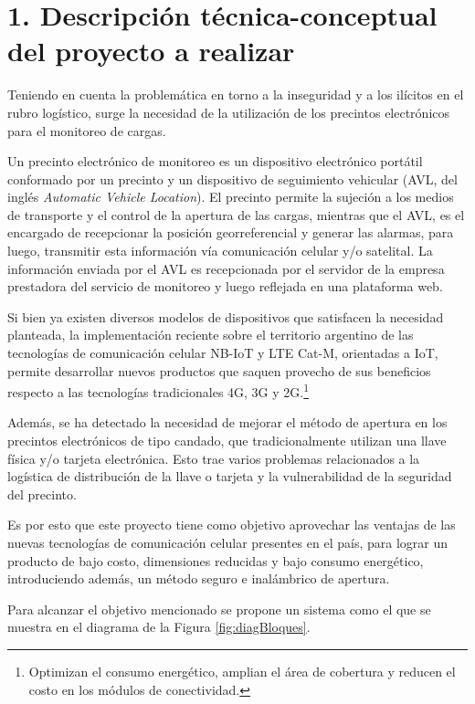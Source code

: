 \documentclass[
11pt, %
]{charter}
\begin{document}
\section{1. Descripción técnica-conceptual del proyecto a realizar}
\label{sec:descripcion}

Teniendo en cuenta la problemática en torno a la inseguridad y a los ilícitos en el rubro logístico, surge la necesidad de la utilización de los precintos electrónicos para el monitoreo de cargas.

Un precinto electrónico de monitoreo es un dispositivo electrónico portátil conformado por un precinto y un dispositivo de seguimiento vehicular (AVL, del inglés \textit{Automatic Vehicle Location}). El precinto permite la sujeción a los medios de transporte y el control de la apertura de las cargas, mientras que el AVL, es el encargado de recepcionar la posición georreferencial y generar las alarmas, para luego, transmitir esta información vía comunicación celular y/o satelital. La información enviada por el AVL es recepcionada por el servidor de la empresa prestadora del servicio de monitoreo y luego reflejada en una plataforma web.

Si bien ya existen diversos modelos de dispositivos que satisfacen la necesidad planteada, la implementación reciente sobre el territorio argentino de las tecnologías de comunicación celular NB-IoT y LTE Cat-M, orientadas a IoT, permite desarrollar nuevos productos que saquen provecho de sus beneficios respecto a las tecnologías tradicionales 4G, 3G y 2G.\footnote{Optimizan el consumo energético, amplian el área de cobertura y reducen el costo en los módulos de conectividad.}

Además, se ha detectado la necesidad de mejorar el método de apertura en los precintos electrónicos de tipo candado, que tradicionalmente utilizan una llave física y/o tarjeta electrónica. Esto trae varios problemas relacionados a la logística de distribución de la llave o tarjeta y la vulnerabilidad de la seguridad del precinto.

Es por esto que este proyecto tiene como objetivo aprovechar las ventajas de las nuevas tecnologías de comunicación celular presentes en el país, para lograr un producto de bajo costo, dimensiones reducidas y bajo consumo energético, introduciendo además, un método seguro e inalámbrico de apertura. 

Para alcanzar el objetivo mencionado se propone un sistema como el que se muestra en el diagrama de la Figura \ref{fig:diagBloques}.
\end{document}
